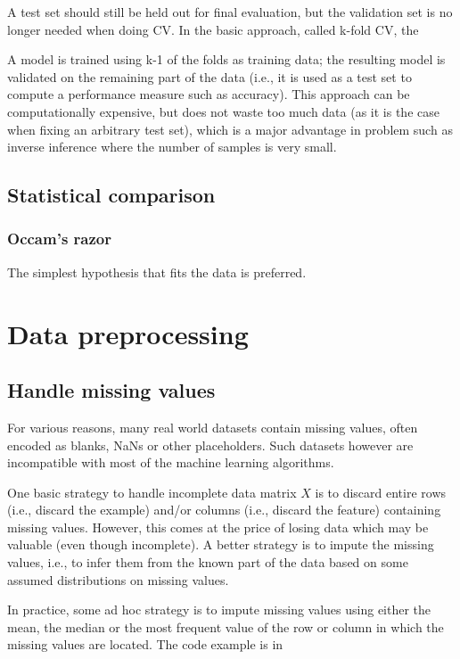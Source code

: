 \begin{refsection}
A test set should still be held out for final evaluation, but the validation set is no longer needed when doing CV. In the basic approach, called k-fold CV, the

A model is trained using k-1 of the folds as training data;
the resulting model is validated on the remaining part of the data (i.e., it is used as a test set to compute a performance measure such as accuracy).
 This approach can be computationally expensive, but does not waste too much data (as it is the case when fixing an arbitrary test set), which is a major advantage in problem such as inverse inference where the number of samples is very small.
 
 
\subsection{Statistical comparison}
 



\subsubsection{Occam's razor}
The simplest hypothesis that fits the data is preferred.


\section{Data preprocessing}




\subsection{Handle missing values}


For various reasons, many real world datasets contain missing values, often encoded as blanks, NaNs or other placeholders. Such datasets however are incompatible with most of the machine learning algorithms.  

One basic strategy to handle incomplete data matrix $X$ is to discard entire rows (i.e., discard the example) and/or columns (i.e., discard the feature) containing missing values. However, this comes at the price of losing data which may be valuable (even though incomplete). A better strategy is to impute the missing values, i.e., to infer them from the known part of the data based on some assumed distributions on missing values.

In practice, some ad hoc strategy is to impute missing values using either the mean, the median or the most frequent value of the row or column in which the missing values are located. The code example is in 



\end{refsection}
